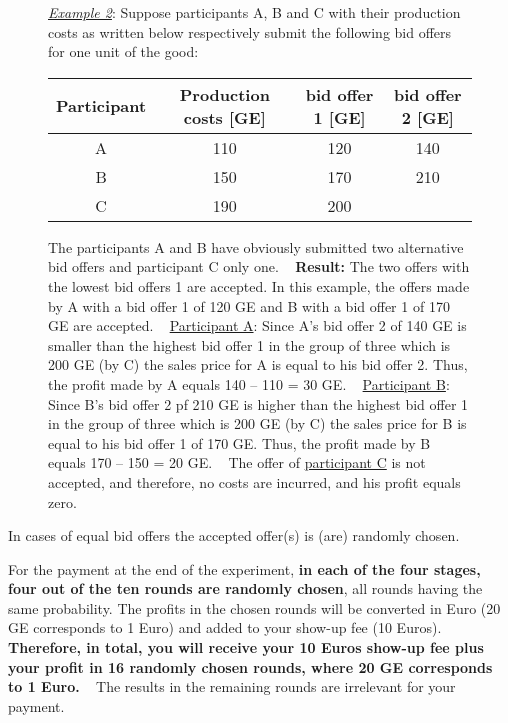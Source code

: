 \documentclass[11pt]{article}
\begin{document}
\begin{figure}[h!] 
	\begin{minipage}[t]{1\linewidth} 
		\begin{tcolorbox}[colback=pink,arc=0pt,colframe=black!25]
			\underline{\textit{Example 2}}: Suppose participants A, B and C with their production costs as written below respectively submit the following bid offers for one unit of the good:
			\begin{center}
				\begin{tabular}{c|ccc}
					Participant & Production costs [GE] & bid offer 1 [GE]	& bid offer 2 [GE] \\
					\hline
					A			& 110				 	& 120 				&	140 \\
					B			& 150	 				& 170				& 	210 \\
					C			& 190					& 200
				\end{tabular} \bigbreak	
			\end{center}	
			The participants A and B have obviously submitted two alternative bid offers and participant C only one.  ~\medbreak
			\textbf{Result:} The two offers with the lowest bid offers 1 are accepted. In this example, the offers made by A with a bid offer 1 of 120 GE and B with a bid offer 1 of 170 GE are accepted. ~\medbreak
			\underline{Participant A}: Since A's bid offer 2 of 140 GE is smaller than the highest bid offer 1 in the group of three which is 200 GE (by C) the sales price for A is equal to his bid offer 2. Thus, the profit made by A equals 140 – 110 = 30 GE. ~\medbreak
			\underline{Participant B}: Since B's bid offer 2 pf 210 GE is higher than the highest bid offer 1 in the group of three which is 200 GE (by C) the sales price for B is equal to his bid offer 1 of 170 GE. Thus, the profit made by B equals 170 – 150 = 20 GE. ~\medbreak			
			The offer of \underline{participant C} is not accepted, and therefore, no costs are incurred, and his profit equals zero.   
		\end{tcolorbox} 		
	\end{minipage}  
\end{figure}



In cases of equal bid offers the accepted offer(s) is (are) randomly chosen.



For the payment at the end of the experiment, \textbf{in each of the four stages, four out of the ten rounds are randomly chosen}, all rounds having the same probability. The profits in the chosen rounds will be converted in Euro (20 GE corresponds to 1 Euro) and added to your show-up fee (10 Euros). \textbf{Therefore, in total, you will receive your 10 Euros show-up fee plus your profit in 16 randomly chosen rounds, where 20 GE corresponds to 1 Euro.} ~\bigbreak
The results in the remaining rounds are irrelevant for your payment.
\end{document}
